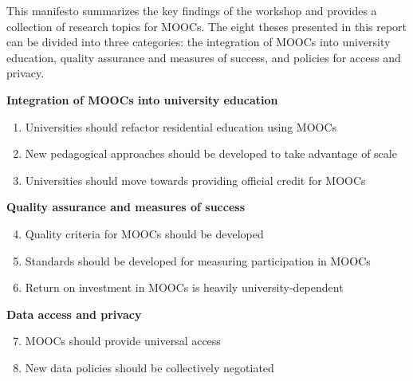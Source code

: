 This manifesto summarizes the key findings of the workshop and provides
a collection of research topics for MOOCs. The eight theses presented in
this report can be divided into three categories: the integration of
MOOCs into university education, quality assurance and measures of
success, and policies for access and privacy.

\vspace{1ex}
\textbf{Integration of MOOCs into university education}

\begin{enumerate}

\item Universities should refactor residential education using
MOOCs

\item New pedagogical approaches should be developed to take
advantage of scale

\item Universities should move towards providing official
credit for MOOCs

\end{enumerate}

\textbf{Quality assurance and measures of success}

\begin{enumerate}
\setcounter{enumi}{3}

\item Quality criteria for MOOCs should be developed 

\item Standards should be developed for measuring
  participation in MOOCs 

\item Return on investment in MOOCs is heavily university-dependent

\end{enumerate}

\textbf{Data access and privacy}

\begin{enumerate}
\setcounter{enumi}{6}

\item MOOCs should provide universal access 

\item New data
policies should be collectively negotiated

\end{enumerate}

